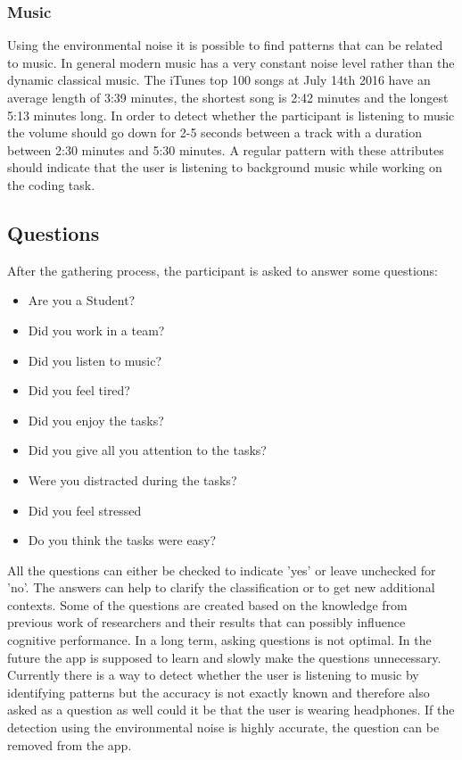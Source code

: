 {\subsubsection{Music}
Using the environmental noise it is possible to find patterns that can be related to music. In general modern music has a very constant noise level rather than the dynamic classical music. The iTunes top 100 songs at July 14th 2016 have an average length of 3:39 minutes, the shortest song is 2:42 minutes and the longest 5:13 minutes long.
In order to detect whether the participant is listening to music the volume should go down for 2-5 seconds between a track with a duration between 2:30 minutes and 5:30 minutes. 
A regular pattern with these attributes should indicate that the user is listening to background music while working on the coding task.

\subsection{Questions}
After the gathering process, the participant is asked to answer some questions:
\begin{itemize}
\item Are you a Student?
\item Did you work in a team?
\item Did you listen to music?
\item Did you feel tired?
\item Did you enjoy the tasks?
\item Did you give all you attention to the tasks?
\item Were you distracted during the tasks?
\item Did you feel stressed
\item Do you think the tasks were easy?
\end{itemize}

All the questions can either be checked to indicate 'yes' or leave unchecked for 'no'. The answers can help to clarify the classification or to get new additional contexts. Some of the questions are created based on the knowledge from previous work of researchers and their results that can possibly influence cognitive performance. 
In a long term, asking questions is not optimal. In the future the app is supposed to learn and slowly make the questions unnecessary. Currently there is a way to detect whether the user is listening to music by identifying patterns but the accuracy is not exactly known and therefore also asked as a question as well could it be that the user is wearing headphones. If the detection using the environmental noise is highly accurate, the question can be removed from the app.
 
}
